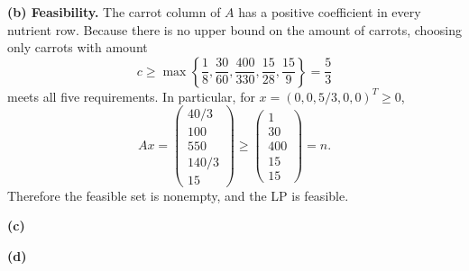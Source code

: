 \documentclass[11pt]{article}
\begin{document}
\textbf{(b) Feasibility.}
The carrot column of $A$ has a positive coefficient in every nutrient row. Because there is no upper bound on the amount of carrots, choosing only carrots with amount
\[
c \ge \max\left\{ \frac{1}{8}, \frac{30}{60}, \frac{400}{330}, \frac{15}{28}, \frac{15}{9} \right\} = \frac{5}{3}
\]
meets all five requirements. In particular, for $x = (0, 0, 5/3, 0, 0)^T \ge 0$,
\[
Ax = \begin{pmatrix} 40/3 \\ 100 \\ 550 \\ 140/3 \\ 15 \end{pmatrix}
\ge \begin{pmatrix} 1 \\ 30 \\ 400 \\ 15 \\ 15 \end{pmatrix} = n.
\]
Therefore the feasible set is nonempty, and the LP is feasible.

\vspace{1.5em}
\textbf{(c)}

\vspace{6em}
\textbf{(d)}
\end{document}
